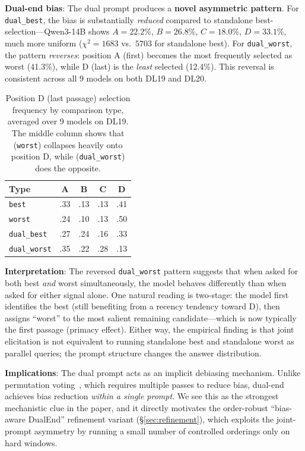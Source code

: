 \textbf{Dual-end bias}: The dual prompt produces a \textbf{novel asymmetric pattern}. For \texttt{dual\_best}, the bias is substantially \emph{reduced} compared to standalone best-selection---Qwen3-14B shows $A=22.2\%$, $B=26.8\%$, $C=18.0\%$, $D=33.1\%$, much more uniform ($\chi^2{=}1683$ vs.\ $5703$ for standalone best). For \texttt{dual\_worst}, the pattern \emph{reverses}: position A (first) becomes the most frequently selected as worst (41.3\%), while D (last) is the \emph{least} selected (12.4\%). This reversal is consistent across all 9 models on both DL19 and DL20.

\begin{table}[!htbp]
\caption{Position D (last passage) selection frequency by comparison type, averaged over 9 models on DL19. The middle column shows that \bottomup{} (\texttt{worst}) collapses heavily onto position D, while \dualend{} (\texttt{dual\_worst}) does the opposite.}
\label{tab:posD}
\small
\begin{tabular}{lcccc}
\toprule
Type & A & B & C & D \\
\midrule
\texttt{best} & .33 & .13 & .13 & .41 \\
\texttt{worst} & .24 & .10 & .13 & .50 \\
\texttt{dual\_best} & .27 & .24 & .16 & .33 \\
\texttt{dual\_worst} & .35 & .22 & .28 & .13 \\
\bottomrule
\end{tabular}
\end{table}

\textbf{Interpretation}: The reversed \texttt{dual\_worst} pattern suggests that when asked for both best \emph{and} worst simultaneously, the model behaves differently than when asked for either signal alone. One natural reading is two-stage: the model first identifies the best (still benefiting from a recency tendency toward D), then assigns ``worst'' to the most salient remaining candidate---which is now typically the first passage (primacy effect). Either way, the empirical finding is that joint elicitation is not equivalent to running standalone best and standalone worst as parallel queries; the prompt structure changes the answer distribution.

\textbf{Implications}: The dual prompt acts as an implicit debiasing mechanism. Unlike permutation voting~\citep{tang2024found}, which requires multiple passes to reduce bias, dual-end achieves bias reduction \emph{within a single prompt}. We see this as the strongest mechanistic clue in the paper, and it directly motivates the order-robust ``bias-aware DualEnd'' refinement variant (\S\ref{sec:refinement}), which exploits the joint-prompt asymmetry by running a small number of controlled orderings only on hard windows.


